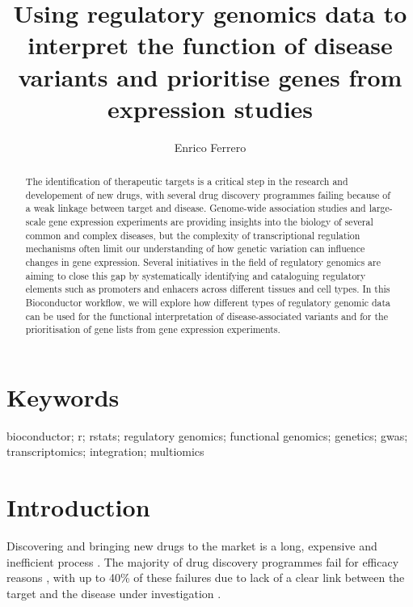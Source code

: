 \documentclass[9pt,a4paper,]{extarticle}
\theoremstyle{definition}
\theoremstyle{definition}
\theoremstyle{definition}
\theoremstyle{remark}
\begin{document}
\pagestyle{front}

\title{Using regulatory genomics data to interpret the function of disease variants and prioritise genes from expression studies}

\author{Enrico Ferrero}

\maketitle
\thispagestyle{front}

\begin{abstract}
The identification of therapeutic targets is a critical step in the research and developement of new drugs, with several drug discovery programmes failing because of a weak linkage between target and disease. Genome-wide association studies and large-scale gene expression experiments are providing insights into the biology of several common and complex diseases, but the complexity of transcriptional regulation mechanisms often limit our understanding of how genetic variation can influence changes in gene expression. Several initiatives in the field of regulatory genomics are aiming to close this gap by systematically identifying and cataloguing regulatory elements such as promoters and enhacers across different tissues and cell types. In this Bioconductor workflow, we will explore how different types of regulatory genomic data can be used for the functional interpretation of disease-associated variants and for the prioritisation of gene lists from gene expression experiments.
\end{abstract}

\section*{Keywords}
bioconductor; r; rstats; regulatory genomics; functional genomics; genetics; gwas; transcriptomics; integration; multiomics


\clearpage
\pagestyle{main}

\section{Introduction}\label{introduction}

Discovering and bringing new drugs to the market is a long, expensive and inefficient process \citep{Waring2015, DiMasi2016}.
The majority of drug discovery programmes fail for efficacy reasons \citep{Harrison2016}, with up to 40\% of these failures due to lack of a clear link between the target and the disease under investigation \citep{Cook2014}.
\end{document}
